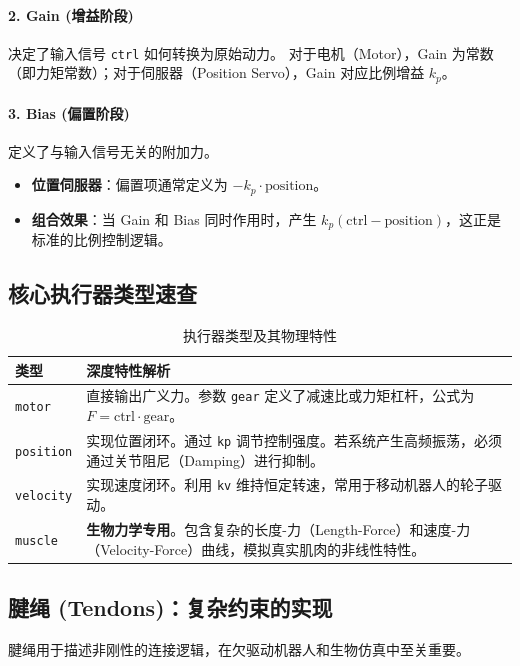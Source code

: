 \documentclass[11pt,a4paper]{book}
\begin{document}
\paragraph{2. Gain (增益阶段)} 
决定了输入信号 \texttt{ctrl} 如何转换为原始动力。
对于电机（Motor），Gain 为常数（即力矩常数）；对于伺服器（Position Servo），Gain 对应比例增益 $k_p$。

\paragraph{3. Bias (偏置阶段)} 
定义了与输入信号无关的附加力。
\begin{itemize}
    \item \textbf{位置伺服器}：偏置项通常定义为 $-k_p \cdot \text{position}$。
    \item \textbf{组合效果}：当 Gain 和 Bias 同时作用时，产生 $k_p(\text{ctrl} - \text{position})$，这正是标准的比例控制逻辑。
\end{itemize}



\subsection{核心执行器类型速查}

\begin{longtable}{lp{10cm}}
\caption{执行器类型及其物理特性} \\
\toprule
\textbf{类型} & \textbf{深度特性解析} \\ \midrule
\texttt{motor} & 直接输出广义力。参数 \texttt{gear} 定义了减速比或力矩杠杆，公式为 $F = \text{ctrl} \cdot \text{gear}$。 \\
\texttt{position} & 实现位置闭环。通过 \texttt{kp} 调节控制强度。若系统产生高频振荡，必须通过关节阻尼（Damping）进行抑制。 \\
\texttt{velocity} & 实现速度闭环。利用 \texttt{kv} 维持恒定转速，常用于移动机器人的轮子驱动。 \\
\texttt{muscle} & \textbf{生物力学专用}。包含复杂的长度-力（Length-Force）和速度-力（Velocity-Force）曲线，模拟真实肌肉的非线性特性。 \\
\bottomrule
\end{longtable}

\subsection{腱绳 (Tendons)：复杂约束的实现}
腱绳用于描述非刚性的连接逻辑，在欠驱动机器人和生物仿真中至关重要。
\end{document}
